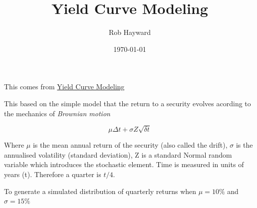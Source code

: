 \documentclass[12pt, a4paper, oneside]{article}\usepackage[]{graphicx}\usepackage[]{color}
\begin{document}
\title{Yield Curve Modeling}
\author{Rob Hayward}
\date{\today}
\maketitle
This comes from \href{http://blog.revolutionanalytics.com/2014/07/quantitative-finance-applications-in-r-7-constructing-a-term-structure-of-interest-rates-using-r-par.html}{Yield Curve Modeling}

This based on the simple model that the return to a security evolves acording to the mechanics of \emph{Brownian motion}

\begin{equation}
\mu \Delta t + \sigma Z \sqrt{\delta t}
\end{equation}

Where $\mu$ is the mean annual return of the security (also called the drift), $\sigma$ is the annualised volatility (standard deviation), Z is a standard Normal random variable which introduces the stochastic element. Time is measured in units of years (t).  Therefore a quarter is $t/4$.  

To generate a simulated distribution of quarterly returns when $\mu = 10\%$ and $\sigma = 15\%$ 
\end{document}
